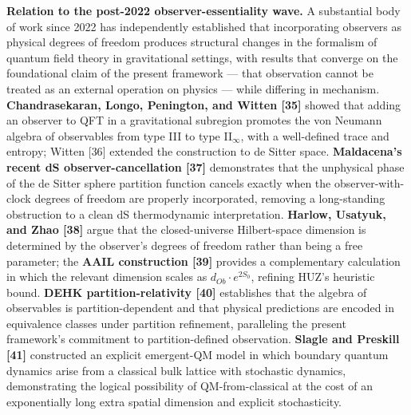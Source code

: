 \documentclass[
]{article}
\begin{document}
\textbf{Relation to the post-2022 observer-essentiality wave.} A
substantial body of work since 2022 has independently established that
incorporating observers as physical degrees of freedom produces
structural changes in the formalism of quantum field theory in
gravitational settings, with results that converge on the foundational
claim of the present framework --- that observation cannot be treated as
an external operation on physics --- while differing in mechanism.
\textbf{Chandrasekaran, Longo, Penington, and Witten {[}35{]}} showed
that adding an observer to QFT in a gravitational subregion promotes the
von Neumann algebra of observables from type III to type II\(_\infty\),
with a well-defined trace and entropy; Witten {[}36{]} extended the
construction to de Sitter space. \textbf{Maldacena's recent dS
observer-cancellation {[}37{]}} demonstrates that the unphysical phase
of the de Sitter sphere partition function cancels exactly when the
observer-with-clock degrees of freedom are properly incorporated,
removing a long-standing obstruction to a clean dS thermodynamic
interpretation. \textbf{Harlow, Usatyuk, and Zhao {[}38{]}} argue that
the closed-universe Hilbert-space dimension is determined by the
observer's degrees of freedom rather than being a free parameter; the
\textbf{AAIL construction {[}39{]}} provides a complementary calculation
in which the relevant dimension scales as \(d_{Ob} \cdot e^{2S_0}\),
refining HUZ's heuristic bound. \textbf{DEHK partition-relativity
{[}40{]}} establishes that the algebra of observables is
partition-dependent and that physical predictions are encoded in
equivalence classes under partition refinement, paralleling the present
framework's commitment to partition-defined observation. \textbf{Slagle
and Preskill {[}41{]}} constructed an explicit emergent-QM model in
which boundary quantum dynamics arise from a classical bulk lattice with
stochastic dynamics, demonstrating the logical possibility of
QM-from-classical at the cost of an exponentially long extra spatial
dimension and explicit stochasticity.
\end{document}
